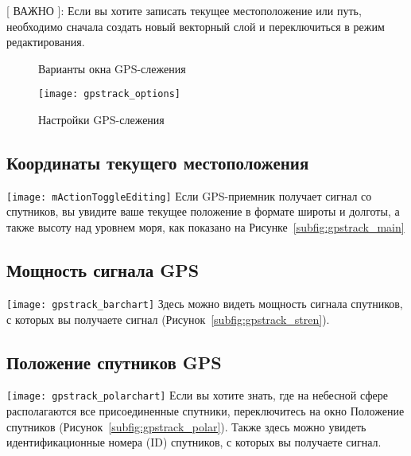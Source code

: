 [ ВАЖНО ]: Если вы хотите записать текущее местоположение или путь,
необходимо сначала создать новый векторный слой и переключиться в режим
редактирования.

\begin{figure}[ht]
\centering
     \hspace{0.33cm}
     \hspace{0.33cm}
\caption{Варианты окна GPS-слежения \wincaption} \label{fig:gpstrack_live}
\end{figure}

\begin{figure}[ht]
   \centering
   \texttt{[image: gpstrack\_options]}
   \caption{Настройки GPS-слежения \wincaption}
   \label{fig:gpstrack_options}
\end{figure}

\subsection{Координаты текущего местоположения}
\texttt{[image: mActionToggleEditing]} Если GPS-приемник
получает сигнал со спутников, вы увидите ваше текущее положение в формате широты
и долготы, а также высоту над уровнем моря, как показано на
Рисунке~\ref{subfig:gpstrack_main}

\subsection{Мощность сигнала GPS}
\texttt{[image: gpstrack\_barchart]} Здесь можно
видеть мощность сигнала спутников, с которых вы получаете сигнал
(Рисунок~\ref{subfig:gpstrack_stren}).

\subsection{Положение спутников GPS}
\texttt{[image: gpstrack\_polarchart]} Если вы
хотите знать, где на небесной сфере располагаются все присоединенные спутники,
переключитесь на окно Положение спутников
(Рисунок~\ref{subfig:gpstrack_polar}). Также здесь можно увидеть
идентификационные номера (ID) спутников, с которых вы получаете сигнал.

